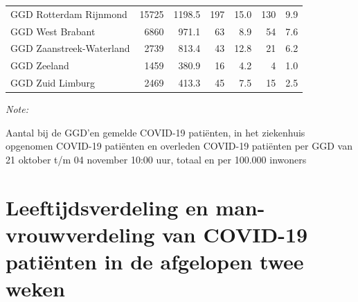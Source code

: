 \documentclass[
  english,
  man,floatsintext]{apa6}
\begin{document}
\begin{table}[H]
\begin{threeparttable}
\begin{tabular}{lrrrrrr}
GGD Rotterdam Rijnmond & 15725 & 1198.5 & 197 & 15.0 & 130 & 9.9\\
GGD West Brabant & 6860 & 971.1 & 63 & 8.9 & 54 & 7.6\\
GGD Zaanstreek-Waterland & 2739 & 813.4 & 43 & 12.8 & 21 & 6.2\\
GGD Zeeland & 1459 & 380.9 & 16 & 4.2 & 4 & 1.0\\
GGD Zuid Limburg & 2469 & 413.3 & 45 & 7.5 & 15 & 2.5\\
\bottomrule
\end{tabular}
\begin{tablenotes}
\item \textit{Note: } 
\item Aantal bij de GGD’en gemelde COVID-19 patiënten, in het ziekenhuis opgenomen COVID-19 patiënten en overleden COVID-19 patiënten per GGD van 21 oktober t/m 04 november 10:00 uur, totaal en per 100.000 inwoners
\end{tablenotes}
\end{threeparttable}
\endgroup{}
\end{table}

\newpage

\hypertarget{leeftijdsverdeling-en-man-vrouwverdeling-van-covid-19-patiuxebnten-in-de-afgelopen-twee-weken}{%
\section{Leeftijdsverdeling en man-vrouwverdeling van COVID-19 patiënten in de afgelopen twee weken}\label{leeftijdsverdeling-en-man-vrouwverdeling-van-covid-19-patiuxebnten-in-de-afgelopen-twee-weken}}
\end{document}
